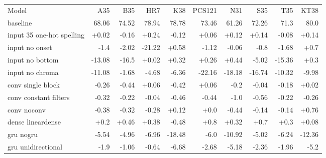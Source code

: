 \begin{tabular}{l|rrrrrrrrr}
Model                     	& A35 	& B35 	& HR7 	& K38 	& PCS121  &	N31 & 	S35 	& T35 	& KT38 \\
baseline                  	& 68.06  	& 74.52  	& 78.94           	& 78.78      	& 73.46             &	61.26          & 	72.26     	& 71.3    	& 80.0           \\
input 35 one-hot spelling 	& +0.02   	& -0.16  	& +0.24            	& -0.12      	& +0.06              &	+0.12           & 	+0.14      	& -0.08   	& +0.14           \\
input no onset            	& -1.4   	& -2.02  	& -21.22          	& +0.58       	& -1.12             &	-0.06          & 	-0.8      	& -1.68   	& +0.7            \\
input no bottom           	& -13.08 	& -16.5  	& +0.02            	& +0.32       	& +0.26              &	+0.44           & 	-5.02     	& -15.36  	& +0.3            \\
input no chroma           	& -11.08 	& -1.68  	& -4.68           	& -6.36      	& -22.16            &	-18.18         & 	-16.74    	& -10.32  	& -9.98          \\
conv single block         	& -0.26  	& -0.44  	& +0.06            	& -0.42      	& +0.06              &	-0.2           & 	-0.04     	& -0.18   	& +0.02           \\
conv constant filters     	& -0.32  	& -0.22  	& -0.04           	& -0.46      	& -0.44             &	-1.0           & 	-0.56     	& -0.22   	& -0.26          \\
conv noconv               	& -0.38  	& -0.32  	& -0.28           	& +0.12       	& +0.0               &	-0.44          & 	-0.14     	& -0.14   	& +0.76           \\
dense lineardense         	& +0.2    	& +0.46   	& +0.38            	& -0.48      	& +0.8               &	+0.32           & 	+0.7       	& +0.3     	& +0.08           \\
gru nogru                 	& -5.54  	& -4.96  	& -6.96           	& -18.48     	& -6.0              &	-10.92         & 	-5.02     	& -6.24   	& -12.36         \\
gru unidirectional        	& -1.9   	& -1.06  	& -0.64           	& -6.68      	& -2.68             &	-5.18          & 	-2.36     	& -1.96   	& -5.2           \\
\end{tabular}

